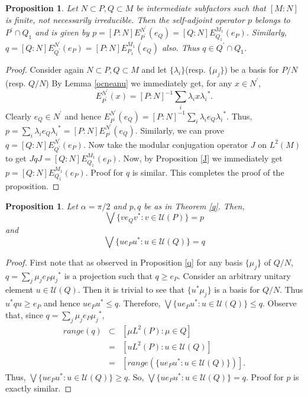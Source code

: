 \documentclass[11pt,letterpaper]{amsart}
\newtheorem{proposition}[theorem]{Proposition}
\theoremstyle{definition}
\theoremstyle{remark}
\begin{document}
\begin{proposition}
 Let $N\subset P,Q\subset M$ be intermediate subfactors such that $[M:N]$ is finite, not necessarily irreducible. Then the  self-adjoint operator $p$ belongs to  $P^{\prime}\cap Q_1$ and is given by $p=[P:N] E^{N^{\prime}}_{P^{\prime}}(e_Q)= [Q:N] E^{M_1}_{Q_1}(e_P).$ Similarly, $q= [Q:N]E^{N^{\prime}}_{Q^{\prime}}(e_P)= [P:N] E^{M_1}_{P_1}(e_Q)$ also. Thus $q\in Q^{\prime}\cap Q_1$.
\end{proposition}


\begin{proof} 
Consider again $N\subset P,Q\subset M$ and let $\{\lambda_i\}$(resp. $\{\mu_j\}$) be a basis for $P/N$ (resp. $Q/N$)
 By Lemma \ref{ocneanu} we immediately get, for any $x\in N^{\prime}$, 
 $$E^{N^{\prime}}_{P^{\prime}}(x)={[P:N]}^{-1}\sum_i {\lambda}_ix{\lambda_i}^*.$$
 Clearly $e_Q\in N^{\prime}$ and hence
 $E^{N^{\prime}}_{P^{\prime}}(e_Q)={[P:N]}^{-1}\sum_i {\lambda}_ie_Q{\lambda_i}^*$. Thus, $p= \sum_i {\lambda}_ie_Q{\lambda_i}^*= [P:N] E^{N^{\prime}}_{P^{\prime}}(e_Q).$ Similarly, we can prove
 $q=[Q:N] E^{N^{\prime}}_{Q^{\prime}}(e_P)$. Now take the modular conjugation operator $J$ on $L^2(M)$ to get $JqJ= [Q:N]  E^{M_1}_{Q_1}(e_P).$
 Now, by Proposition \ref{J} we immediately get $p= [Q:N]  E^{M_1}_{Q_1}(e_P).$ Proof for $q$ is similar. This completes the proof of the proposition.
\end{proof}



\begin{proposition}\label{central}
 Let $\alpha= \pi/2$ and $p,q$ be as in Theorem \ref{q}. Then,
 $$\bigvee\{ve_Qv^*: v\in \mathcal{U}(P)\}=p$$ and
 $$ \bigvee\{ue_Pu^*: u\in \mathcal{U}(Q)\}=q$$
\end{proposition}


\begin{proof}
 First note that as observed in Proposition \ref{q} for any  basis $\{\mu_j\}$ of $Q/N$, $q= \sum_j \mu_j e_P {\mu_j}^*$ is a projection such that $q\geq e_P$.
 Consider an arbitrary unitary element $u\in \mathcal{U}(Q)$. Then it is trivial to see that $\{u^*\mu_j\}$ is a basis for $Q/N$.
 Thus $u^*qu \geq e_P$ and hence $ue_Pu^*\leq q$. Therefore, $\bigvee \{ue_Pu^*:u\in \mathcal{U}(Q)\}\leq q$.
  Observe that, since $q=\sum_j \mu_j e_P {\mu_j}^*$,
  \begin{eqnarray*}
   range(q)& \subset &[\mu L^2(P):\mu \in Q]\\
   & = & [u L^2(P): u\in \mathcal{U}(Q)]\\
   & = &[range(\{ue_Pu^*: u\in \mathcal{U}(Q)\})].
   \end{eqnarray*}
 Thus, $\bigvee\{ue_Pu^*:u\in \mathcal{U}(Q)\}\geq q$.
So, $\bigvee \{ue_P u^*:u\in \mathcal{U}(Q)\}= q$. Proof for $p$ is exactly similar.
\end{proof}
\end{document}
